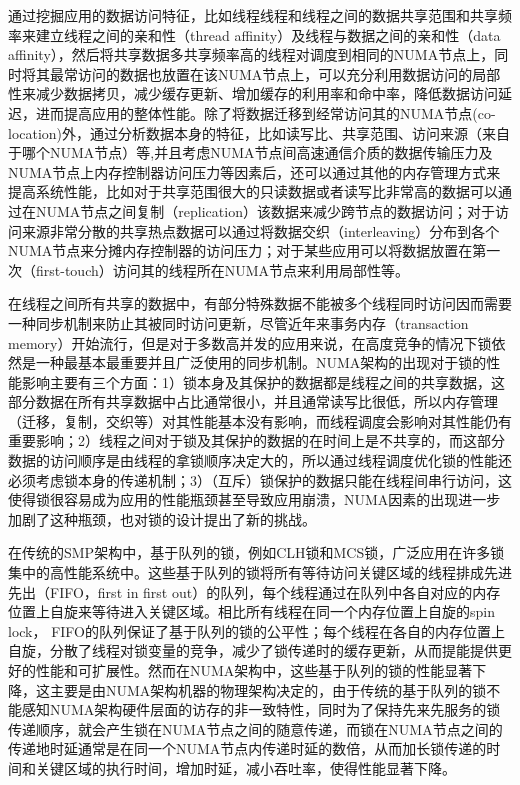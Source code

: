 通过挖掘应用的数据访问特征，比如线程线程和线程之间的数据共享范围和共享频率来建立线程之间的亲和性（thread affinity）及线程与数据之间的亲和性（data affinity）\cite{diener2014kmaf}\cite{azimi2009enhancing}\cite{tikir2008hardware}，然后将共享数据多共享频率高的线程对调度到相同的NUMA节点上，同时将其最常访问的数据也放置在该NUMA节点上，可以充分利用数据访问的局部性来减少数据拷贝，减少缓存更新、增加缓存的利用率和命中率，降低数据访问延迟，进而提高应用的整体性能\cite{chishti2005optimizing}。除了将数据迁移到经常访问其的NUMA节点(co-location)外，通过分析数据本身的特征，比如读写比、共享范围、访问来源（来自于哪个NUMA节点）等,并且考虑NUMA节点间高速通信介质的数据传输压力及NUMA节点上内存控制器访问压力等因素后，还可以通过其他的内存管理方式来提高系统性能\cite{dashti2013traffic}\cite{molka2011memory}，比如对于共享范围很大的只读数据或者读写比非常高的数据可以通过在NUMA节点之间复制（replication）该数据来减少跨节点的数据访问；对于访问来源非常分散的共享热点数据可以通过将数据交织（interleaving）分布到各个NUMA节点来分摊内存控制器的访问压力；对于某些应用可以将数据放置在第一次（first-touch）访问其的线程所在NUMA节点来利用局部性等。

在线程之间所有共享的数据中，有部分特殊数据不能被多个线程同时访问因而需要一种同步机制来防止其被同时访问更新，尽管近年来事务内存（transaction memory）开始流行，但是对于多数高并发的应用来说，在高度竞争的情况下锁依然是一种最基本最重要并且广泛使用的同步机制\cite{tallent2010analyzing}\cite{johnson2010decoupling}。NUMA架构的出现对于锁的性能影响主要有三个方面：1）锁本身及其保护的数据都是线程之间的共享数据，这部分数据在所有共享数据中占比通常很小，并且通常读写比很低，所以内存管理（迁移，复制，交织等）对其性能基本没有影响，而线程调度会影响对其性能仍有重要影响；2）线程之间对于锁及其保护的数据的在时间上是不共享的，而这部分数据的访问顺序是由线程的拿锁顺序决定大的，所以通过线程调度优化锁的性能还必须考虑锁本身的传递机制；3）（互斥）锁保护的数据只能在线程间串行访问，这使得锁很容易成为应用的性能瓶颈甚至导致应用崩溃\cite{boyd2012non}，NUMA因素的出现进一步加剧了这种瓶颈，也对锁的设计提出了新的挑战。

在传统的SMP架构中，基于队列的锁，例如CLH锁\cite{craig1993building}\cite{magnusson1994queue}\cite{scott2013shared}和MCS锁\cite{mellor1991algorithms}\cite{scott2013shared}，广泛应用在许多锁集中的高性能系统中\cite{dice2011flat}。这些基于队列的锁将所有等待访问关键区域的线程排成先进先出（FIFO，first in first out）的队列，每个线程通过在队列中各自对应的内存位置上自旋来等待进入关键区域。相比所有线程在同一个内存位置上自旋的spin lock， FIFO的队列保证了基于队列的锁的公平性；每个线程在各自的内存位置上自旋，分散了线程对锁变量的竞争，减少了锁传递时的缓存更新，从而提能提供更好的性能和可扩展性。然而在NUMA架构中，这些基于队列的锁的性能显著下降，这主要是由NUMA架构机器的物理架构决定的，由于传统的基于队列的锁不能感知NUMA架构硬件层面的访存的非一致特性，同时为了保持先来先服务的锁传递顺序，就会产生锁在NUMA节点之间的随意传递，而锁在NUMA节点之间的传递地时延通常是在同一个NUMA节点内传递时延的数倍，从而加长锁传递的时间和关键区域的执行时间，增加时延，减小吞吐率，使得性能显著下降。

